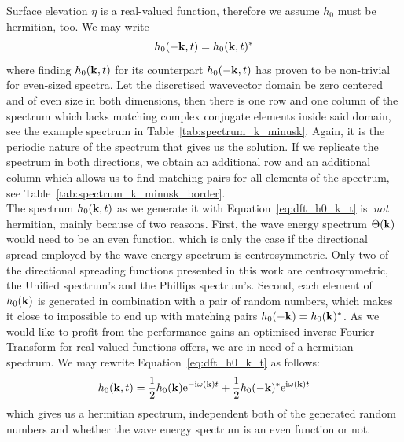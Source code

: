Surface elevation $\eta$ is a real-valued function, therefore we assume $h_0$ must be hermitian,
too. We may write
\begin{equation}
\label{eq:h0_k_complex_conjugate}
 h_0(\mathbf{-k},t) = h_0(\mathbf{k},t)^*
\end{equation}
where finding $h_0(\mathbf{k},t)$ for its counterpart $h_0(-\mathbf{k},t)$ has proven to be non-trivial
for even-sized spectra.
Let the discretised wavevector domain be zero centered and of even size in both dimensions,
then there is one row and one column of the spectrum which lacks
matching complex conjugate elements inside said domain, see the example spectrum in Table~\ref{tab:spectrum_k_minusk}.
Again, it is the periodic nature of the spectrum that gives us the solution. If we replicate
the spectrum in both directions, we obtain an additional row and an additional column which
allows us to find matching pairs for all elements of the spectrum, see Table~\ref{tab:spectrum_k_minusk_border}.\\


The spectrum $h_0(\mathbf{k},t)$ as we generate it with Equation~\ref{eq:dft_h0_k_t} is~\emph{not}
hermitian, mainly because of two reasons. First, the wave energy spectrum $\Theta(\mathbf{k})$ would need
to be an even function, which is only the case if the directional spread employed by
the wave energy spectrum is centrosymmetric. Only two of the directional spreading functions
presented in this work are centrosymmetric, the Unified spectrum's and the Phillips spectrum's.
Second, each element of $h_0(\mathbf{k})$ is generated in combination with a pair of random numbers,
which makes it close to impossible to end up with matching pairs $h_0(-\mathbf{k})=h_0(\mathbf{k})^*$.
As we would like to profit from the performance gains an optimised inverse Fourier Transform
for real-valued functions offers, we are in need of a hermitian spectrum. We may rewrite
Equation~\ref{eq:dft_h0_k_t} as follows:
%
\begin{equation}
\label{eq:dft_h0_k_t_hermitian}
 h_0(\mathbf{k}, t) =
 \frac{1}{2} h_0(\mathbf{k})\mathrm{e}^{-\mathrm{i}\omega(\mathbf{k})t}
 + \frac{1}{2} h_0(\mathbf{-k})^*\mathrm{e}^{\mathrm{i}\omega(\mathbf{k})t}
\end{equation}
%
which gives us a hermitian spectrum, independent both of the generated random numbers and 
whether the wave energy spectrum is an even function or not.\\


